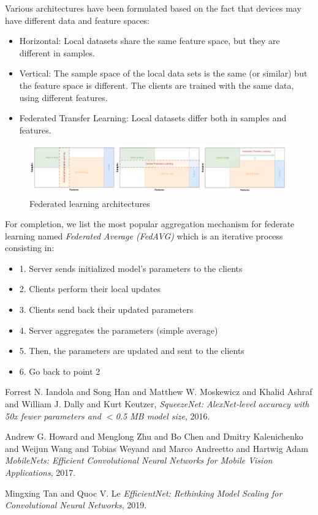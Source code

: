 \documentclass{article}
\begin{document}
    Various architectures have been formulated based on the fact that devices may have different data and feature spaces:
    \begin{itemize}
      \item Horizontal: Local datasets share the same feature space, but they are different in samples.
      \item Vertical: The sample space of the local data sets is the same (or similar) but the feature space is different. The clients are trained with the same data, using different features.
      \item Federated Transfer Learning: Local datasets differ both in samples and features.
    \end{itemize}

    \begin{figure}[H]
      \includegraphics[scale=0.2]{../Images/FLArch.png}
      \centering
      \caption{Federated learning architectures}
    \end{figure}

    For completion, we list the most popular aggregation mechanism for federate learning named \emph{Federated Average (FedAVG)} which is an iterative process consisting in:
    \begin{itemize}
      \item 1. Server sends initialized model’s
      parameters to the clients
      \item 2. Clients perform their local updates
      \item 3. Clients send back their updated
      parameters
      \item 4. Server aggregates the parameters
      (simple average)
      \item 5. Then, the parameters are updated
      and sent to the clients
      \item 6. Go back to point 2
    \end{itemize}
    
\newpage
\begin{thebibliography}{9}

  Forrest N. Iandola and Song Han and Matthew W. Moskewicz and Khalid Ashraf and William J. Dally and Kurt Keutzer,
  \textit{SqueezeNet: AlexNet-level accuracy with 50x fewer parameters and $<$0.5 MB model size},
  2016.

  Andrew G. Howard and Menglong Zhu and Bo Chen and Dmitry Kalenichenko and Weijun Wang and Tobias Weyand and Marco Andreetto and Hartwig Adam  
  \textit{MobileNets: Efficient Convolutional Neural Networks for Mobile Vision Applications},
  2017.

  Mingxing Tan and Quoc V. Le
  \textit{EfficientNet: Rethinking Model Scaling for Convolutional Neural Networks},
  2019.
  
  \end{thebibliography}




  
\end{document}

